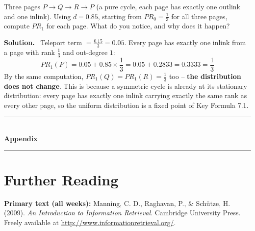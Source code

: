 \documentclass[11pt, a4paper]{article}
\newcommand{\Solution}{\medskip\noindent\textbf{\color{exgreen}Solution.}\ }
\begin{document}
\begin{exercisebox}
Three pages $P\to Q\to R\to P$ (a pure cycle, each page has exactly one outlink and one inlink). Using $d=0.85$, starting from $PR_0=\tfrac13$ for all three pages, compute $PR_1$ for each page. What do you notice, and why does it happen?
\end{exercisebox}
\Solution
Teleport term $=\frac{0.15}{3}=0.05$. Every page has exactly one inlink from a page with rank $\tfrac13$ and out-degree $1$:
\[
PR_1(P) = 0.05 + 0.85\times\frac13 = 0.05+0.2833 = 0.3333 = \frac13
\]
By the same computation, $PR_1(Q)=PR_1(R)=\tfrac13$ too -- \textbf{the distribution does not change}. This is because a symmetric cycle is already at its stationary distribution: every page has exactly one inlink carrying exactly the same rank as every other page, so the uniform distribution is a fixed point of Key Formula 7.1.

\clearpage
{}
{}
\begin{center}
\rule{0.9\textwidth}{1pt}\\[4pt]
{\Huge\bfseries\color{primary} Appendix}\\[4pt]
\rule{0.9\textwidth}{1pt}
\end{center}
\vspace{1em}

\section*{Further Reading}

\textbf{Primary text (all weeks):} Manning, C. D., Raghavan, P., \& Sch\"utze, H. (2009). \textit{An Introduction to Information Retrieval}. Cambridge University Press. Freely available at \url{http://www.informationretrieval.org/}.
\end{document}
